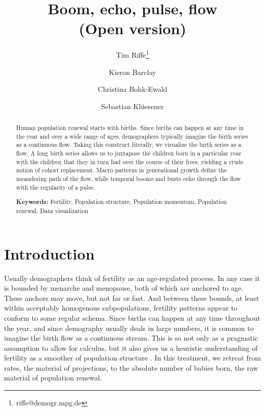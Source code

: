 \documentclass{article}
\begin{document}
\title{Boom, echo, pulse, flow\\ \small (Open version)}
\author[1]{Tim Riffe\thanks{riffe@demogr.mpg.de}}
\author[1]{Kieron Barclay}
\author[1]{Christina Bohk-Ewald}
\author[2]{Sebastian Kl\"uesener}
\maketitle

\begin{abstract}
Human population renewal starts with births. Since births can happen at any
time in the year and over a wide range of ages, demographers typically imagine
the birth series as a continuous flow. Taking this construct literally, we
visualize the birth series as a flow. A long birth series allows us to
juxtapose the children born in a particular year with the children that
they in turn had over the course of their lives, yielding a crude notion of
cohort replacement. Macro patterns in generational growth define the meandering
path of the flow, while temporal booms and busts echo through the flow with the
regularity of a pulse.
\vspace{1em}

{\bf Keywords:} Fertility, Population structure, Population momentum, Population renewal, Data visualization
\end{abstract}

\onehalfspacing
\section{Introduction}
Usually demographers think of fertility as an age-regulated process. In any case it is
bounded by menarche and menopause, both of which are anchored to age. These anchors may
move, but not far or fast. And between these bounds, at least within acceptably homogenous subpopulations, fertility patterns appear to conform to some regular schema. Since births can happen at any time throughout the year, and since demography usually deals in large numbers, it is common to imagine the birth flow as a continuous stream. This is so not only as a pragmatic assumption to allow for calculus, but it also gives us a heuristic understanding of fertility as a smoother of population structure \citep{arthur1982ergodic}. In this treatment, we retreat from rates, the material of projections, to the absolute number of babies born, the raw material of population renewal. 
\end{document}
